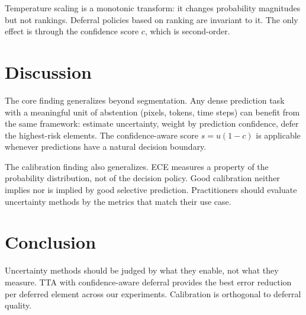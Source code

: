 \documentclass[11pt]{article}
\begin{document}
Temperature scaling is a monotonic transform: it changes probability magnitudes
but not rankings. Deferral policies based on ranking are invariant to it.
The only effect is through the confidence score $c$, which is second-order.

\section{Discussion}

The core finding generalizes beyond segmentation. Any dense prediction task
with a meaningful unit of abstention (pixels, tokens, time steps) can benefit
from the same framework: estimate uncertainty, weight by prediction confidence,
defer the highest-risk elements. The confidence-aware score $s = u(1-c)$ is
applicable whenever predictions have a natural decision boundary.

The calibration finding also generalizes. ECE measures a property of the
probability distribution, not of the decision policy. Good calibration
neither implies nor is implied by good selective prediction. Practitioners
should evaluate uncertainty methods by the metrics that match their use case.

\section{Conclusion}

Uncertainty methods should be judged by what they enable, not what they
measure. TTA with confidence-aware deferral provides the best error reduction
per deferred element across our experiments. Calibration is orthogonal to
deferral quality.



\end{document}
